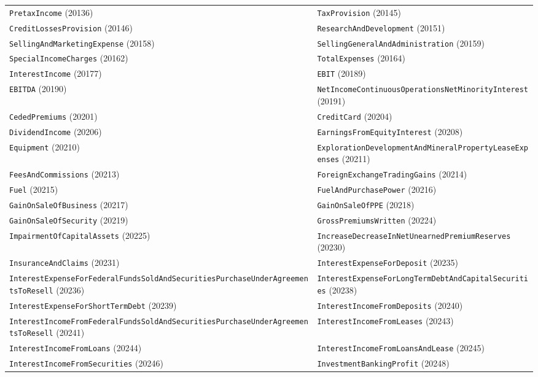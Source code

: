 \documentclass[11pt,a4paper]{report}
\begin{document}
\begin{subappendices}
{\begin{longtable}{@{}p{}p{}@{}}
\texttt{PretaxIncome} (20136) & \texttt{TaxProvision} (20145) \\
\texttt{CreditLossesProvision} (20146) & \texttt{ResearchAndDevelopment} (20151) \\
\texttt{SellingAndMarketingExpense} (20158) & \texttt{SellingGeneralAndAdministration} (20159) \\
\texttt{SpecialIncomeCharges} (20162) & \texttt{TotalExpenses} (20164) \\
\texttt{InterestIncome} (20177) & \texttt{EBIT} (20189) \\
\texttt{EBITDA} (20190) & \texttt{NetIncomeContinuousOperationsNetMinorityInterest} (20191) \\
\texttt{CededPremiums} (20201) & \texttt{CreditCard} (20204) \\
\texttt{DividendIncome} (20206) & \texttt{EarningsFromEquityInterest} (20208) \\
\texttt{Equipment} (20210) & \texttt{ExplorationDevelopmentAndMineralPropertyLeaseExpenses} (20211) \\
\texttt{FeesAndCommissions} (20213) & \texttt{ForeignExchangeTradingGains} (20214) \\
\texttt{Fuel} (20215) & \texttt{FuelAndPurchasePower} (20216) \\
\texttt{GainOnSaleOfBusiness} (20217) & \texttt{GainOnSaleOfPPE} (20218) \\
\texttt{GainOnSaleOfSecurity} (20219) & \texttt{GrossPremiumsWritten} (20224) \\
\texttt{ImpairmentOfCapitalAssets} (20225) & \texttt{IncreaseDecreaseInNetUnearnedPremiumReserves} (20230) \\
\texttt{InsuranceAndClaims} (20231) & \texttt{InterestExpenseForDeposit} (20235) \\
\texttt{InterestExpenseForFederalFundsSoldAndSecuritiesPurchaseUnderAgreementsToResell} (20236) & \texttt{InterestExpenseForLongTermDebtAndCapitalSecurities} (20238) \\
\texttt{InterestExpenseForShortTermDebt} (20239) & \texttt{InterestIncomeFromDeposits} (20240) \\
\texttt{InterestIncomeFromFederalFundsSoldAndSecuritiesPurchaseUnderAgreementsToResell} (20241) & \texttt{InterestIncomeFromLeases} (20243) \\
\texttt{InterestIncomeFromLoans} (20244) & \texttt{InterestIncomeFromLoansAndLease} (20245) \\
\texttt{InterestIncomeFromSecurities} (20246) & \texttt{InvestmentBankingProfit} (20248) \\

\end{longtable}}
\end{subappendices}
\end{document}
